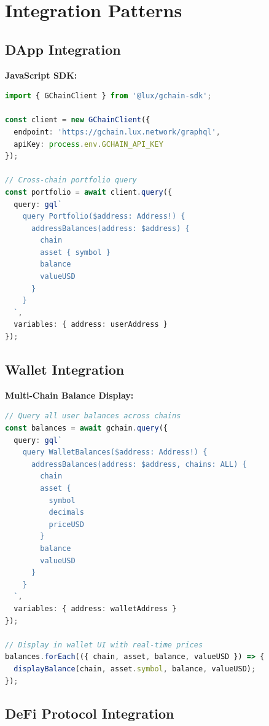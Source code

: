 \section{Integration Patterns}


\subsection{DApp Integration}

\textbf{JavaScript SDK:}
\begin{lstlisting}[language=TypeScript, basicstyle=\small\ttfamily]
import { GChainClient } from '@lux/gchain-sdk';

const client = new GChainClient({
  endpoint: 'https://gchain.lux.network/graphql',
  apiKey: process.env.GCHAIN_API_KEY
});

// Cross-chain portfolio query
const portfolio = await client.query({
  query: gql`
    query Portfolio($address: Address!) {
      addressBalances(address: $address) {
        chain
        asset { symbol }
        balance
        valueUSD
      }
    }
  `,
  variables: { address: userAddress }
});
\end{lstlisting}

\subsection{Wallet Integration}

\textbf{Multi-Chain Balance Display:}
\begin{lstlisting}[language=TypeScript, basicstyle=\small\ttfamily]
// Query all user balances across chains
const balances = await gchain.query({
  query: gql`
    query WalletBalances($address: Address!) {
      addressBalances(address: $address, chains: ALL) {
        chain
        asset {
          symbol
          decimals
          priceUSD
        }
        balance
        valueUSD
      }
    }
  `,
  variables: { address: walletAddress }
});

// Display in wallet UI with real-time prices
balances.forEach(({ chain, asset, balance, valueUSD }) => {
  displayBalance(chain, asset.symbol, balance, valueUSD);
});
\end{lstlisting}

\subsection{DeFi Protocol Integration}

